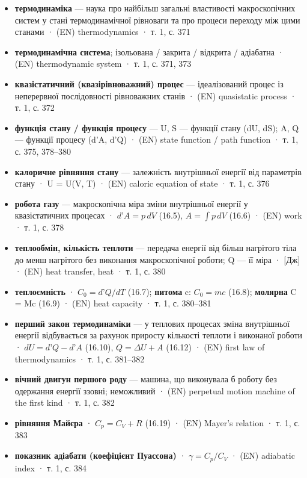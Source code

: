 \documentclass[11pt,a4paper,oneside]{book}
\newcommand{\book}{}
\begin{document}
\begin{itemize}
\item \textbf{термодинаміка} — наука про найбільш загальні властивості макроскопічних систем у стані термодинамічної рівноваги та про процеси переходу між цими станами · (EN) thermodynamics · \book{} т. 1, с. 371
\item \textbf{термодинамічна система}; ізольована / закрита / відкрита / адіабатна · (EN) thermodynamic system · \book{} т. 1, с. 371, 373
\item \textbf{квазістатичний (квазірівноважний) процес} — ідеалізований процес із неперервної послідовності рівноважних станів · (EN) quasistatic process · \book{} т. 1, с. 372
\item \textbf{функція стану / функція процесу} — U, S — функції стану (dU, dS); A, Q — функції процесу (d'A, d'Q) · (EN) state function / path function · \book{} т. 1, с. 375, 378–380
\item \textbf{калоричне рівняння стану} — залежність внутрішньої енергії від параметрів стану · U = U(V, T) · (EN) caloric equation of state · \book{} т. 1, с. 376
\item \textbf{робота газу} — макроскопічна міра зміни внутрішньої енергії у квазістатичних процесах · $d\text{'}A = p\,dV$ (16.5), $A = \int p\,dV$ (16.6) · (EN) work · \book{} т. 1, с. 378
\item \textbf{теплообмін, кількість теплоти} — передача енергії від більш нагрітого тіла до менш нагрітого без виконання макроскопічної роботи; Q — її міра · [Дж] · (EN) heat transfer, heat · \book{} т. 1, с. 380
\item \textbf{теплоємність} · $C_0 = d\text{'}Q/dT$ (16.7); \textbf{питома} c: $C_0 = mc$ (16.8); \textbf{молярна} C = Mc (16.9) · (EN) heat capacity · \book{} т. 1, с. 380–381
\item \textbf{перший закон термодинаміки} — у теплових процесах зміна внутрішньої енергії відбувається за рахунок приросту кількості теплоти і виконаної роботи · $dU = d\text{'}Q - d\text{'}A$ (16.10), $Q = \Delta U + A$ (16.12) · (EN) first law of thermodynamics · \book{} т. 1, с. 381–382
\item \textbf{вічний двигун першого роду} — машина, що виконувала б роботу без одержання енергії ззовні; неможливий · (EN) perpetual motion machine of the first kind · \book{} т. 1, с. 382
\item \textbf{рівняння Майєра} · $C_p = C_V + R$ (16.19) · (EN) Mayer's relation · \book{} т. 1, с. 383
\item \textbf{показник адіабати (коефіцієнт Пуассона)} · $\gamma = C_p/C_V$ · (EN) adiabatic index · \book{} т. 1, с. 384

\end{itemize}
\end{document}
